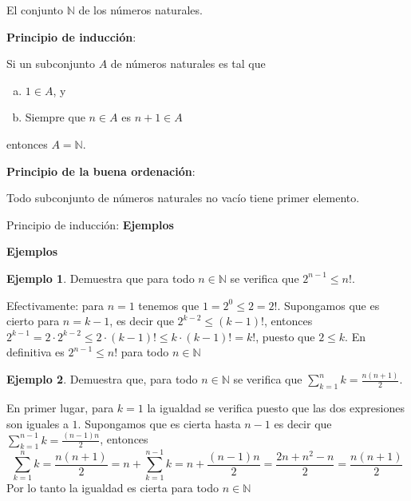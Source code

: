 \documentclass[ignorenonframetext,]{beamer}
\begin{document}
\begin{frame}{El conjunto \(\mathbb{N}\) de los números naturales.}
\protect\hypertarget{el-conjunto-mathbbn-de-los-nuxfameros-naturales.}{}

\textbf{Principio de inducción}:

Si un subconjunto \(A\) de números naturales es tal que

\begin{enumerate}
[a)]
\item
  \(1 \in A\), y
\item
  Siempre que \(n \in A\) es \(n+1 \in A\)
\end{enumerate}

entonces \(A = \mathbb{N}\).

\textbf{Principio de la buena ordenación}:

Todo subconjunto de números naturales no vacío tiene primer elemento.

\end{frame}

\begin{frame}{Principio de inducción: \textbf{Ejemplos}}
\protect\hypertarget{principio-de-inducciuxf3n-ejemplos}{}

\textbf{Ejemplos}

\textbf{Ejemplo 1}. Demuestra que para todo \(n\in \mathbb{N}\) se
verifica que \(2^{n-1}\leq n!\).

Efectivamente: para \(n=1\) tenemos que \(1=2^0 \leq 2 =2!\). Supongamos
que es cierto para \(n=k-1\), es decir que \(2^{k-2} \leq (k-1)!\),
entonces
\(2^{k-1} = 2\cdot 2^{k-2} \leq 2 \cdot (k-1)! \leq k\cdot(k-1)! =k!\),
puesto que \(2\leq k\). En definitiva es \(2^{n-1}\leq n!\) para todo
\(n \in \mathbb{N}\)

\textbf{Ejemplo 2}. Demuestra que, para todo \(n \in \mathbb{N}\) se
verifica que \(\displaystyle{\sum_{k=1}^n k = \frac{n(n+1)}{2}}\).

En primer lugar, para \(k=1\) la igualdad se verifica puesto que las dos
expresiones son iguales a \(1\). Supongamos que es cierta hasta \(n-1\)
es decir que \(\displaystyle{\sum_{k=1}^{n-1} k = \frac{(n-1)n}{2}}\),
entonces \[
\sum_{k=1}^n k = \frac{n(n+1)}{2} = n+\sum_{k=1}^{n-1} k = n+  \frac{(n-1)n}{2}= \frac{2n+n^2-n}{2} = \frac{n(n+1)}{2}
\] Por lo tanto la igualdad es cierta para todo \(n \in \mathbb{N}\)

\end{frame}
\end{document}
